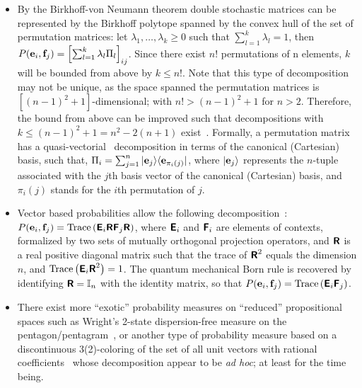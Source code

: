 \documentclass[%
  twocolumn,
 showpacs,
 showkeys,
 preprintnumbers,
 amsmath,amssymb,
 aps,
  pra,
  longbibliography,
 ]{revtex4-1}
\begin{document}
\begin{itemize}
\item
By the Birkhoff-von Neumann theorem double stochastic matrices can be represented by the Birkhoff polytope
spanned by the convex hull of the set of permutation matrices:
let  $\lambda_1, \ldots , \lambda_k \ge 0$ such that $\sum_{l=1}^k\lambda_l=1$,
then
$P( {\bf e}_i, {\bf f}_j ) = \left[\sum_{l=1}^k \lambda_l \Pi_l\right]_{ij}$.
Since there exist $n!$ permutations of n elements, $k$ will be bounded from above by $k\le n!$.
Note that this type of decomposition may not be unique,
as the space spanned the permutation matrices is $\left[(n-1)^2+1\right]$-dimensional; with $n!>(n-1)^2+1$ for $n>2$.
Therefore,  the bound from above can be improved such that decompositions with $k \le (n-1)^2 +1= n^2-2(n+1)$ exist~\citep{Marcus-Ree-1959}.
Formally, a permutation matrix has a quasi-vectorial~\citep{mermin-07}
decomposition in terms of the canonical (Cartesian) basis,
such that, $\Pi_i=\sum_{j=1}^n \vert {\bf e}_j \rangle \langle {\bf e}_{\pi_i (j)} \vert $,
where $\vert {\bf e}_j \rangle$ represents the $n$-tuple
associated with the $j$th basis vector
of the canonical (Cartesian) basis, and $\pi_i(j)$ stands for the $i$th permutation of $j$.



\item
Vector based probabilities allow the following decomposition~\citep{Auffeves-Grangier-2017,Auffeves-Grangier-2018}:
$P( {\bf e}_i, {\bf f}_j ) =\text{Trace} \left(\textsf{\textbf{E}}_i \textsf{\textbf{R}}  \textsf{\textbf{F}}_j \textsf{\textbf{R}}
\right)$, where $\textsf{\textbf{E}}_i$ and $\textsf{\textbf{F}}_i$ are elements of contexts,
formalized by two sets of mutually orthogonal projection operators,
and $\textsf{\textbf{R}}$  is a real positive diagonal matrix such that the
trace of $\textsf{\textbf{R}}^2$ equals the dimension $n$, and
$\text{Trace}\left(\textsf{\textbf{E}}_i \textsf{\textbf{R}}^2
\right) = 1$. The quantum mechanical Born rule is recovered by identifying $\textsf{\textbf{R}}=\mathbb{I}_n$ with the identity matrix,
so that $P( {\bf e}_i, {\bf f}_j ) =\text{Trace} \left(\textsf{\textbf{E}}_i   \textsf{\textbf{F}}_j  \right)$.


\item
There exist more ``exotic'' probability measures on ``reduced'' propositional spaces
such as Wright's 2-state dispersion-free measure on the pentagon/pentagram~\citep{wright:pent},
or another type of probability measure based on a discontinuous 3(2)-coloring
of the set of all unit vectors with rational coefficients~\citep{godsil-zaks,meyer:99,havlicek-2000}
whose decomposition appear to be {\it ad hoc}; at least for the time being.
\end{itemize}
\end{document}
